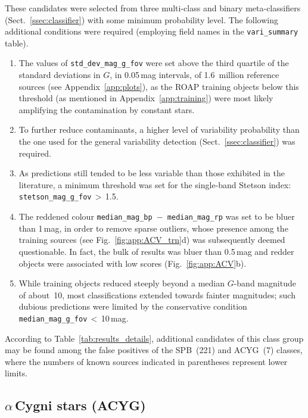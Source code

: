 \documentclass[longauth]{aa}
\def\g{$G$\xspace}
\begin{document}
These candidates were selected from three multi-class and binary meta-classifiers (Sect.~\ref{ssec:classifier}) with some minimum probability level. The following additional conditions were required (employing field names in the \texttt{vari\_summary} table).
\begin{enumerate} 
    \item The values of \texttt{std\_dev\_mag\_g\_fov} were set above the third quartile of the standard deviations in \g, in 0.05\,mag intervals, of 1.6~million reference sources (see Appendix~\ref{app:plots}), as the ROAP training objects below this threshold (as mentioned in Appendix~\ref{app:training}) were most likely amplifying the contamination by constant stars.
    \item To further reduce contaminants, a higher level of variability probability than the one used for the general variability detection (Sect.~\ref{ssec:classifier}) was required.
    \item As predictions still tended to be less variable than those exhibited in the literature, a minimum threshold was set for the single-band Stetson index: \texttt{stetson\_mag\_g\_fov}\,$>$\,1.5.
    \item The reddened colour \texttt{median\_mag\_bp\,$-$\,median\_mag\_rp} was set to be bluer than 1\,mag, in order to remove sparse outliers,   whose presence among the training sources (see Fig.~\ref{fig:app:ACV_trn}d) was subsequently deemed questionable. In fact, the bulk of results was bluer than 0.5\,mag and redder objects were associated with low scores (Fig.~\ref{fig:app:ACV}b).
    \item While training objects reduced steeply beyond a median \g-band magnitude of about~10, most classifications extended towards fainter magnitudes; such dubious predictions were limited by the conservative condition \texttt{median\_mag\_g\_fov}\,$<$\,10\,mag.
\end{enumerate}

According to Table~\ref{tab:results_details}, additional candidates of this class group may be found among the false positives of the SPB~(221) and ACYG~(7) classes, where the numbers of known sources indicated in parentheses represent lower limits.


\subsection{$\alpha$\,Cygni stars (ACYG)\label{ssec:acyg}}
\end{document}
